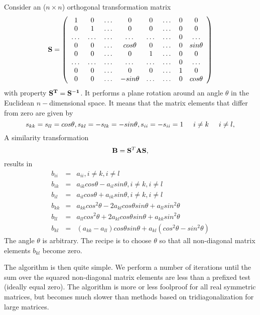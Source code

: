 Consider an  ($n\times n$) orthogonal transformation matrix 
%
\[
{\bf S}=
 \left( 
   \begin{array}{cccccccc}
   1  &    0  & \dots &   0        &    0  & \dots & 0 &   0       \\
   0  &    1  & \dots &   0        &    0  & \dots & 0 &   0       \\
\dots & \dots & \dots & \dots      & \dots & \dots & 0 & \dots     \\ 
   0  &    0  & \dots & cos\theta  &    0  & \dots & 0 & sin\theta \\
   0  &    0  & \dots &   0        &    1  & \dots & 0 &   0       \\
\dots & \dots & \dots & \dots      & \dots & \dots & 0 & \dots     \\
   0  &    0  & \dots &   0        &    0  & \dots & 1 &   0       \\ 
   0  &    0  & \dots & -sin\theta & \dots & \dots & 0 &cos\theta  
   \end{array}
 \right)
\]
%
with property ${\bf S^{T}} = {\bf S^{-1}}$.
It performs a plane rotation around an angle $\theta$ in the Euclidean 
$n-$dimensional space. It means that the matrix elements that differ
from zero are given by
%
\[
    s_{kk}= s_{ll}=cos\theta, 
    s_{kl}=-s_{lk}= -sin\theta, 
    s_{ii}=-s_{ii}=1\hspace{0.5cm} i\ne k \hspace{0.5cm} i \ne l,
\]
%
A similarity transformation 
%
\[
     {\bf B}= {\bf S}^T {\bf A}{\bf S},
\]
%
results in 
\begin{eqnarray*}
b_{ii} &=& a_{ii}, i \ne k, i \ne l \\
b_{ik} &=& a_{ik}cos\theta - a_{il}sin\theta , i \ne k, i \ne l \\
b_{il} &=& a_{il}cos\theta + a_{ik}sin\theta , i \ne k, i \ne l \nonumber\\
b_{kk} &=& a_{kk}cos^2\theta - 2a_{kl}cos\theta sin\theta +a_{ll}sin^2\theta\nonumber\\
b_{ll} &=& a_{ll}cos^2\theta +2a_{kl}cos\theta sin\theta +a_{kk}sin^2\theta\nonumber\\
b_{kl} &=& (a_{kk}-a_{ll})cos\theta sin\theta +a_{kl}(cos^2\theta-sin^2\theta)\nonumber 
\end{eqnarray*}
%
The angle $\theta$ is  arbitrary. The recipe is to choose  $\theta$ so that all
non-diagonal matrix elements $b_{kl}$ become zero.  

The algorithm is then quite simple. We perform a number of iterations until
the sum over the squared non-diagonal matrix elements are less than
a prefixed  test (ideally equal zero). 
The algorithm is more or less foolproof for all
real symmetric matrices, but becomes much slower than methods based
on tridiagonalization for large matrices. 


